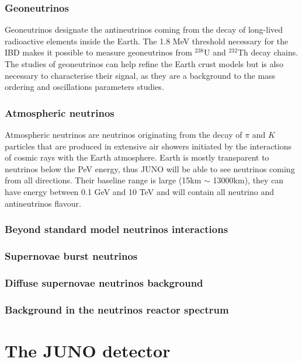 \subsubsection{Geoneutrinos}

Geoneutrinos designate the antineutrinos coming from the decay of long-lived radioactive elements inside the Earth. The 1.8 MeV threshold necessary for the IBD makes it possible to measure geoneutrinos from $^238$U and $^232$Th decay chains. The studies of geoneutrinos can help refine the Earth crust models but is also necessary to characterise their signal, as they are a background to the mass ordering and oscillations parameters studies.

\subsubsection{Atmospheric neutrinos}

Atmospheric neutrinos are neutrinos originating from the decay of $\pi$ and $K$ particles that are produced in extensive air showers initiated by the interactions of cosmic rays with the Earth atmosphere. Earth is mostly transparent to neutrinos below the PeV energy, thus JUNO will be able to see neutrinos coming from all directions. Their baseline range is large (15km $\sim$ 13000km), they can have energy between 0.1 GeV and 10 TeV and will contain all neutrino and antineutrinos flavour.

\subsubsection{Beyond standard model neutrinos interactions}

\subsubsection{Supernovae burst neutrinos}

\subsubsection{Diffuse supernovae neutrinos background}

\subsubsection{Background in the neutrinos reactor spectrum}

\section{The JUNO detector}

